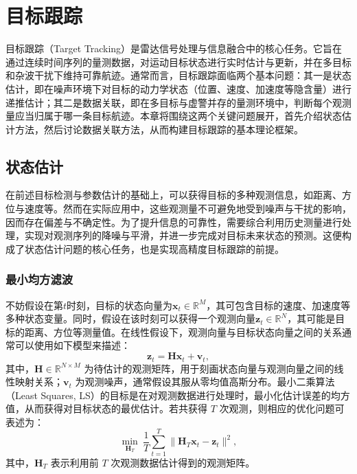 \chapter{目标跟踪}

目标跟踪（Target Tracking）是雷达信号处理与信息融合中的核心任务。它旨在通过连续时间序列的量测数据，对运动目标状态进行实时估计与更新，并在多目标和杂波干扰下维持可靠航迹。通常而言，目标跟踪面临两个基本问题：其一是状态估计，即在噪声环境下对目标的动力学状态（位置、速度、加速度等隐含量）进行递推估计；其二是数据关联，即在多目标与虚警并存的量测环境中，判断每个观测量应当归属于哪一条目标航迹。本章将围绕这两个关键问题展开，首先介绍状态估计方法，然后讨论数据关联方法，从而构建目标跟踪的基本理论框架。

\section{状态估计}
在前述目标检测与参数估计的基础上，可以获得目标的多种观测信息，如距离、方位与速度等。然而在实际应用中，这些观测量不可避免地受到噪声与干扰的影响，因而存在偏差与不确定性。为了提升信息的可靠性，需要综合利用历史测量进行处理，实现对观测序列的降噪与平滑，并进一步完成对目标未来状态的预测。这便构成了状态估计问题的核心任务，也是实现高精度目标跟踪的前提。

\subsection{最小均方滤波}

不妨假设在第\( t \)时刻，目标的状态向量为\( \bm{x}_t \in \mathbb{R}^M \)，其可包含目标的速度、加速度等多种状态变量。同时，假设在该时刻可以获得一个观测向量\( \bm{z}_t \in \mathbb{R}^N \)，其可能是目标的距离、方位等测量值。在线性假设下，观测向量与目标状态向量之间的关系通常可以使用如下模型来描述：
\[
    \bm{z}_t = \mathbf{H} \bm{x}_t + \bm{v}_t,
\]
其中，$\mathbf{H} \in \mathbb{R}^{N \times M}$ 为待估计的观测矩阵，用于刻画状态向量与观测向量之间的线性映射关系；$\bm{v}_t$ 为观测噪声，通常假设其服从零均值高斯分布。最小二乘算法（Least Squares, LS）的目标是在对观测数据进行处理时，最小化估计误差的均方值，从而获得对目标状态的最优估计。若共获得 $T$ 次观测，则相应的优化问题可表述为：
\[
    \min_{\mathbf{H}_T} \ \frac{1}{T}\sum_{t=1}^{T} \big\| \mathbf{H}_T\bm{x}_t - \bm{z}_t \big\|^2,
\]
其中，\( \mathbf{H}_T \) 表示利用前 \( T \) 次观测数据估计得到的观测矩阵。

